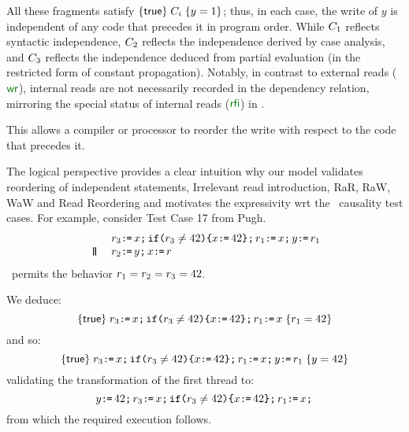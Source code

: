 All these fragments satisfy $\hoare{\TRUE}{\aCmd_i}{\bLoc =1}$; thus, in each
case, the write of $y$ is independent of any code that precedes it in program
order. While $\aCmd_1$ reflects syntactic independence, $\aCmd_2$ reflects
the independence derived by case analysis, and $\aCmd_3$ reflects the
independence deduced from partial evaluation (in the restricted form of
constant propagation).  Notably, in contrast to external reads ($\rrfe$),
internal reads are not necessarily recorded in the dependency relation,
mirroring the special status of internal reads ($\rrfi$) in \armeight.

This allows a compiler or processor to reorder the write with respect to the
code that precedes it.

The logical perspective provides a clear intuition why our model validates
reordering of independent statements, Irrelevant read introduction, RaR, RaW,
WaW and Read Reordering and motivates the expressivity wrt the \jmm\
causality test cases.  For example, consider Test Case 17 from Pugh.
\[
\begin{array}{ll}
 &\aReg_3 \GETS \aLoc \SEMI \IF{\aReg_3 \neq 42} \THEN \aLoc \GETS 42  \FI \SEMI \aReg_1 \GETS \aLoc \SEMI \bLoc \GETS \aReg_1  \\
 \PAR & \aReg_2 \GETS \bLoc \SEMI \aLoc \GETS \aReg 
\end{array}
\]
\jmm\ permits the behavior $\aReg_1 = \aReg_2 = \aReg_3 =42$.

We deduce:
\[
\hoare{\TRUE}{\aReg_3 \GETS \aLoc \SEMI \IF{\aReg_3 \neq 42} \THEN \aLoc \GETS 42  \FI \SEMI \aReg_1 \GETS \aLoc }{\aReg_1 =42}
\]
and so:
\[
\hoare{\TRUE}{\aReg_3 \GETS \aLoc \SEMI \IF{\aReg_3 \neq 42} \THEN \aLoc \GETS 42  \FI \SEMI \aReg_1 \GETS \aLoc  \SEMI \bLoc \GETS \aReg_1  }{\bLoc =42}
\]
validating the transformation of the first thread to:
\[ \bLoc \GETS 42 \SEMI \aReg_3 \GETS \aLoc \SEMI \IF{\aReg_3 \neq 42} \THEN \aLoc \GETS 42  \FI \SEMI \aReg_1 \GETS \aLoc \SEMI \]
from which the required execution follows.

